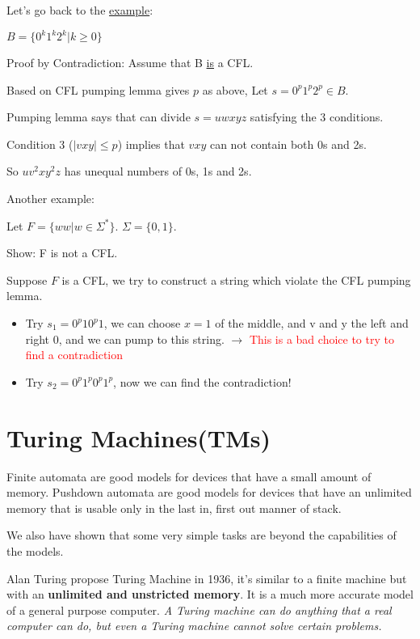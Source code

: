Let's go back to the \hyperref[eg: 5.1]{example}:
\begin{example}
    \(B = \{ 0^k1^k2^k | k \geq 0 \} \) 

    Proof by Contradiction:
    Assume that B \underline{is} a CFL.

    Based on CFL pumping lemma gives \(p\) as above, Let \(s = 0^p1^p2^p \in B\).  

    Pumping lemma says that can divide \(s = uwxyz\) satisfying the 3 conditions. 

    Condition 3 (\(|vxy| \leq p\)) implies that \(vxy\) can not contain both 0s and 2s. 

    So \(uv^2xy^2z\) has unequal numbers of 0s, 1s and 2s.
\end{example}

Another example:
\begin{example}
    Let \(F = \{ ww|w \in \Sigma^* \} \). \(\Sigma = \{ 0, 1 \} \). 
    
    Show: F is not a CFL.  

    Suppose \(F\) is a CFL, we try to construct a string which violate the CFL pumping lemma. 

    \begin{itemize}
        \item Try \(s_1 = 0^p10^p1\), we can choose \(x = 1\) of the middle, and v and y the left and right 0, and we can pump to this string. 
        \(\rightarrow\) \textcolor{red}{This is a bad choice to try to find a contradiction} 
        \item Try \(s_2 = 0^p 1^p 0^p 1^p\), now we can find the contradiction!
    \end{itemize}
\end{example}

\section{Turing Machines(TMs)}

Finite automata are good models for devices that have a small amount of memory. Pushdown automata are good models for devices that have an unlimited memory that is usable only in the last in, first out manner of stack.

We also have shown that some very simple tasks are beyond the capabilities of the models.

Alan Turing propose Turing Machine in 1936, it's similar to a finite machine but with an \textbf{unlimited and unstricted memory}. It is a much more accurate model of a general purpose computer. \textit{A Turing machine can do anything that a real computer can do, but even a Turing machine cannot solve certain problems.}

